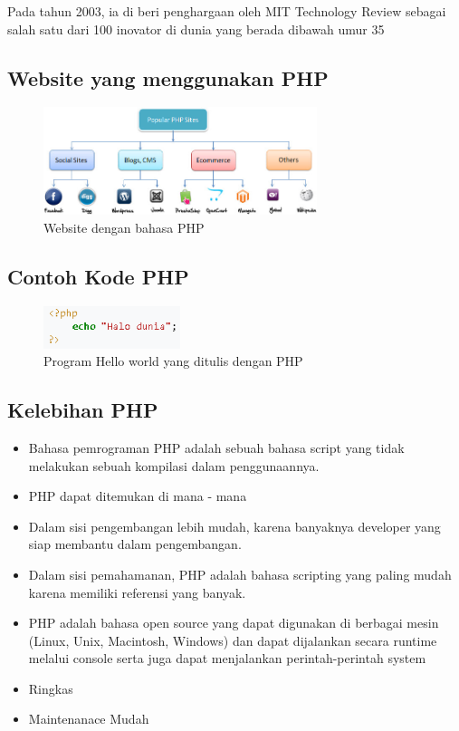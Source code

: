 \begin{enumerate}
Pada tahun 2003, ia di beri penghargaan oleh MIT Technology Review sebagai salah satu dari 100 inovator di dunia yang berada dibawah umur 35
\subsection{Website yang menggunakan PHP} 
	\begin{figure}[H]
		\includegraphics[width=8cm]{figures/web/popularphpsites.jpg}
		\centering
		\caption{Website dengan bahasa PHP}
	\end{figure}

\subsection{Contoh Kode PHP}
	\begin{figure}[H]
		\includegraphics[width=4cm]{figures/web/contohkodingphp.png}
		\centering
		\caption{Program Hello world yang ditulis dengan PHP}
	\end{figure}

\subsection{Kelebihan PHP}
\begin{itemize}
	\item Bahasa pemrograman PHP adalah sebuah bahasa script yang tidak melakukan sebuah kompilasi dalam penggunaannya.
	\item PHP dapat ditemukan di mana - mana
	\item Dalam sisi pengembangan lebih mudah, karena banyaknya developer yang siap membantu dalam pengembangan.
	\item Dalam sisi pemahamanan, PHP adalah bahasa scripting yang paling mudah karena memiliki referensi yang banyak.
	\item PHP adalah bahasa open source yang dapat digunakan di berbagai mesin (Linux, Unix, Macintosh, Windows) dan dapat dijalankan secara runtime melalui console serta juga dapat menjalankan perintah-perintah system
	\item Ringkas
	\item Maintenanace Mudah
\end{itemize}

\end{enumerate}
